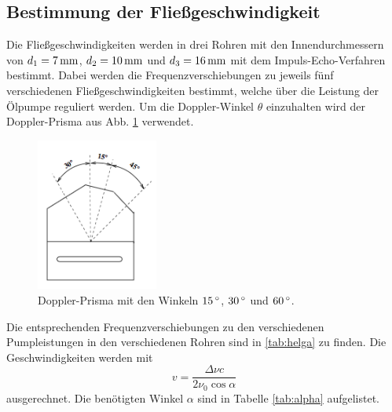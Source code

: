 \subsection{Bestimmung der Fließgeschwindigkeit}
Die Fließgeschwindigkeiten werden in drei Rohren mit den Innendurchmessern von
$d_1 = 7\,\si{\milli\meter}$, $d_2 = 10\,\si{\milli\meter}$ und $d_3=16\,\si{\milli\meter}$ mit dem Impuls-Echo-Verfahren bestimmt.
Dabei werden die Frequenzverschiebungen zu jeweils fünf verschiedenen
Fließgeschwindigkeiten bestimmt, welche über die Leistung der Ölpumpe reguliert werden.
Um die Doppler-Winkel $\theta$ einzuhalten wird der Doppler-Prisma aus Abb. \ref{fig:prisma} verwendet.
\begin{figure}
  \centering
  \includegraphics[width=4cm]{bilder/winkel.png}
  \caption{Doppler-Prisma mit den Winkeln $15\,\si{\degree}$, $30\,\si{\degree}$ und $60\,\si{\degree}$.}
  \label{fig:prisma}
\end{figure}
\noindent Die entsprechenden Frequenzverschiebungen zu den verschiedenen Pumpleistungen in den verschiedenen Rohren sind in \ref{tab:helga} zu finden.
Die Geschwindigkeiten werden mit
\begin{equation}
  v = \frac{\Delta \nu c}{2 \nu_0 \cos{\alpha}}
\end{equation}
ausgerechnet. Die benötigten Winkel $\alpha$ sind in Tabelle \ref{tab:alpha} aufgelistet.

